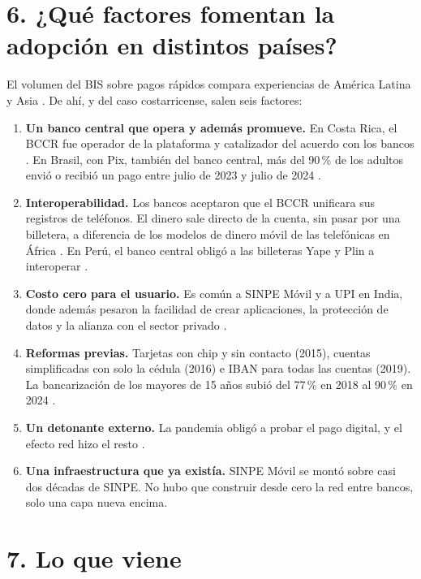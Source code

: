 \documentclass[11pt,letterpaper]{article}
\begin{document}
\section*{6. ¿Qué factores fomentan la adopción en distintos países?}

El volumen del BIS sobre pagos rápidos compara experiencias de América Latina y
Asia \parencite{aurazo2024}. De ahí, y del caso costarricense, salen seis
factores:

\begin{enumerate}
  \item \textbf{Un banco central que opera y además promueve.} En Costa Rica, el
    BCCR fue operador de la plataforma y catalizador del acuerdo con los bancos
    \parencite{aurazo2024}. En Brasil, con Pix, también del banco central, más
    del 90\,\% de los adultos envió o recibió un pago entre julio de 2023 y
    julio de 2024 \parencite{aurazo2024}.
  \item \textbf{Interoperabilidad.} Los bancos aceptaron que el BCCR unificara
    sus registros de teléfonos. El dinero sale directo de la cuenta, sin pasar
    por una billetera, a diferencia de los modelos de dinero móvil de las
    telefónicas en África \parencite{araujo2024}. En Perú, el banco central
    obligó a las billeteras Yape y Plin a interoperar \parencite{aurazo2024}.
  \item \textbf{Costo cero para el usuario.} Es común a SINPE Móvil y a UPI en
    India, donde además pesaron la facilidad de crear aplicaciones, la
    protección de datos y la alianza con el sector privado
    \parencite{cornelli2024}.
  \item \textbf{Reformas previas.} Tarjetas con chip y sin contacto (2015),
    cuentas simplificadas con solo la cédula (2016) e IBAN para todas las
    cuentas (2019). La bancarización de los mayores de 15 años subió del 77\,\%
    en 2018 al 90\,\% en 2024 \parencite{araujo2024}.
  \item \textbf{Un detonante externo.} La pandemia obligó a probar el pago
    digital, y el efecto red hizo el resto \parencite{araujo2024}.
  \item \textbf{Una infraestructura que ya existía.} SINPE Móvil se montó sobre
    casi dos décadas de SINPE. No hubo que construir desde cero la red entre
    bancos, solo una capa nueva encima.
\end{enumerate}

\section*{7. Lo que viene}
\end{document}
